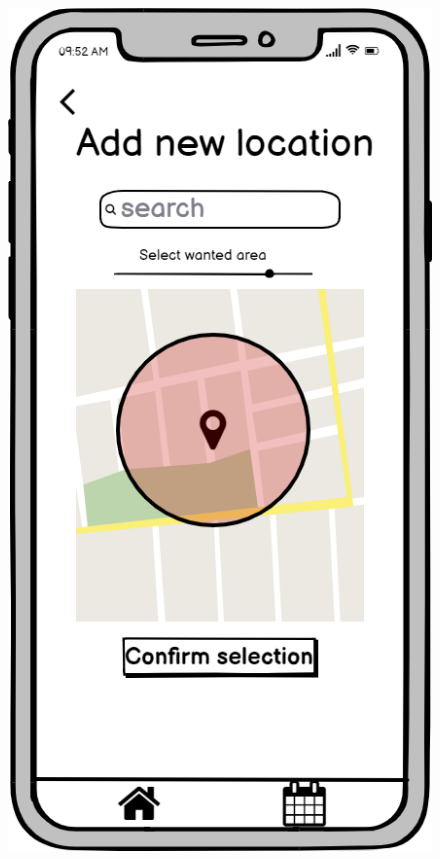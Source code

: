 \documentclass[10pt,xcolor=pdflatex,hyperref={unicode}]{beamer}
\begin{document}
\begin{frame}
\begin{figure}
\begin{minipage}{0.3\textwidth}
            \includegraphics[width=0.25\paperwidth]{img/wireframe2.png}
        \end{minipage}
        \hfill
        \begin{minipage}{0.3\textwidth}

\end{minipage}
\end{figure}
\end{frame}
\end{document}
